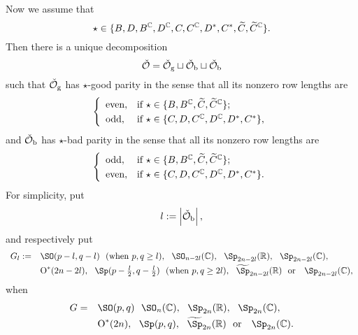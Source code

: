 \documentclass[counting_main.tex]{subfiles}
\begin{document}
Now we assume that
\[
\star\in \{ B, D,   B^{\mathbb{C}}, D^{\mathbb{C}}, C, C^{\mathbb{C}}, D^*, C^*, \widetilde C, \widetilde C^{\mathbb{C}}\}.
\]
Then there is a unique decomposition
 \[
   \check {{\mathcal {O}}}=\check {{\mathcal {O}}}_{\mathrm g} \sqcup \check {{\mathcal {O}}}_{\mathrm b}\sqcup \check {{\mathcal {O}}}_{\mathrm b}
 \]
 such that $\check {{\mathcal {O}}}_{\mathrm g}$ has $\star$-good parity in the sense that all its nonzero row lengths are
 \[
 \left\{
     \begin{array}{ll}
       \textrm{even}, &\hbox{if $\star\in \{B, B^\C, \widetilde C, \widetilde C^\C\}$}; \smallskip\\
         \textrm{odd}, &\hbox{if $\star\in \{C, D, C^\C, D^\C, D^*, C^*\}$},
          \end{array}
   \right.
   \]
   and $\check {{\mathcal {O}}}_{\mathrm b}$ has $\star$-bad parity in the sense that
   all its nonzero row lengths are
 \[
 \left\{
     \begin{array}{ll}
       \textrm{odd}, &\hbox{if  $\star\in \{B, B^\C, \widetilde C, \widetilde C^\C\}$}; \smallskip\\
         \textrm{even}, &\hbox{if  $\star\in \{C, D, C^\C, D^\C, D^*, C^*\}$}.
          \end{array}
   \right.
   \]
For simplicity, put
\[
  l:=\left|{\check {{\mathcal {O}}}_{\mathrm b}}\right|,
\]
and respectively put
\[
 \begin{array}{rl}
    G_l:=  & \SO(p-l,q-l)\ \  (\textrm{when $p,q\geq l$}),   \ \     \SO_{n-2l}(\C),  \  \   \Sp_{2n-2l}(\R), \  \ \Sp_{2n-2l}(\C), \smallskip \\
  & \oO^*(2n-2l), \ \  \Sp(p-\frac{l}{2},q-\frac{l}{2}) \ \  (\textrm{when $p,q\geq 2l$}),  \ \   \widetilde \Sp_{2n-2l}(\R) \ \ \textrm{or }  \ \  \Sp_{2n-2l}(\C),
     \end{array}
\]
when \[
 \begin{array}{rl}
    G=  & \SO(p,q)   \ \     \SO_{n}(\C),  \  \   \Sp_{2n}(\R), \  \ \Sp_{2n}(\C), \smallskip \\
  & \oO^*(2n), \ \  \Sp(p,q),  \ \   \widetilde \Sp_{2n}(\R) \ \ \textrm{or }  \ \  \Sp_{2n}(\C).
     \end{array}
\]
\end{document}
